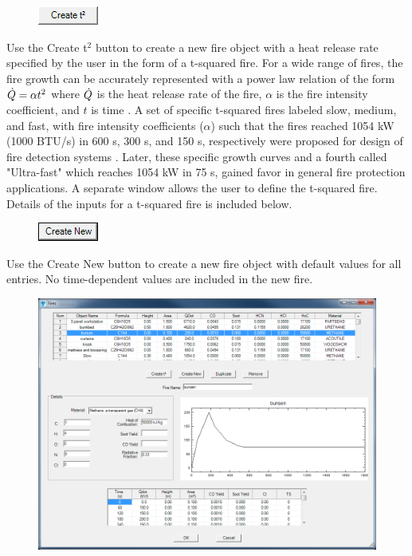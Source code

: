\begin{figure}
  \includegraphics[width=0.781in]{FIGURES/Input_File/Create_t2_Button}
\end{figure}

Use the Create t$^2$ button to create a new fire object with a heat release rate specified by the user in the form of a t-squared fire.  For a wide range of fires, the fire growth can be accurately represented with a power law relation of the form $\dot{Q}=\alpha t^2$  where $\dot{Q}$  is the heat release rate of the fire, $\alpha$ is the fire intensity coefficient, and $t$ is time \cite{Schifiliti:2002}. A set of specific t-squared fires labeled slow, medium, and fast, with fire intensity coefficients ($\alpha$) such that the fires reached 1054 kW (1000 BTU/s) in 600 s, 300 s, and 150 s, respectively were proposed for design of fire detection systems .  Later, these specific growth curves and a fourth called "Ultra-fast" which reaches 1054 kW in 75 s, gained favor in general fire protection applications. A separate window allows the user to define the t-squared fire. Details of the inputs for a t-squared fire is included below.
 

\begin{figure}
  \includegraphics[width=0.781in]{FIGURES/Input_File/Create_New_Button}
\end{figure}

Use the Create New button to create a new fire object with default values for all entries.  No time-dependent values are included in the new fire.

\begin{figure}[h!]
\begin{center}
\includegraphics[width=6.5in]{FIGURES/Input_File/Fire_Object_Edit}
\end{center}
\end{figure}

